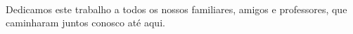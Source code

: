 \
\vfill

\begin{flushright}
\hfill \textit
\bigskip


\bigskip


\bigskip


\bigskip


\bigskip


\bigskip


\bigskip

{
Dedicamos este trabalho a todos os nossos familiares, amigos e professores, que caminharam juntos conosco at\'e aqui.}
\end{flushright}

\vspace*{1cm}

\clearpage